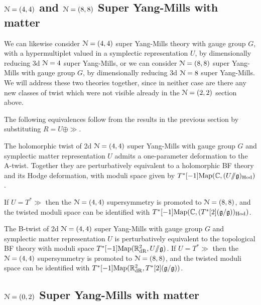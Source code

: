 \documentclass[10pt, oneside]{article}
\newcommand{\ham}{/\!\!/}
\begin{document}
\subsection{\texorpdfstring{$\mathcal N=(4,4)$}{N=(4,4)} and \texorpdfstring{$\mathcal N=(8,8)$}{N=(8,8)} Super Yang-Mills with matter} \label{sec:2d(4,4)}
We can likewise consider $\mathcal{N}=(4,4)$ super Yang-Mills theory with gauge group $G$, with a hypermultiplet valued in a symplectic representation $U$, by dimensionally reducing 3d $\mathcal{N}=4$ super Yang-Mills, or we can consider $\mathcal{N}=(8,8)$ super Yang-Mills with gauge group $G$, by dimensionally reducing 3d $\mathcal{N}=8$ super Yang-Mills.  We will address these two theories together, since in neither case are there any new classes of twist which were not visible already in the $\mathcal{N}=(2,2)$ section above.  

The following equivalences follow from the results in the previous section by substituting $R = U \oplus \gg$.

\begin{theorem}
The holomorphic twist of 2d $\mathcal{N}=(4,4)$ super Yang-Mills with gauge group $G$ and symplectic matter representation $U$ admits a one-parameter deformation to the A-twist.  Together they are perturbatively equivalent to a holomorphic BF theory and its Hodge deformation, with moduli space given by $T^*[-1]\mr{Map}(\CC, (U \ham \gg)_{\mr{Hod}})$.

If $U = T^*\gg$ then the $\mathcal{N}=(4,4)$ supersymmetry is promoted to $\mathcal{N}=(8,8)$, and the twisted moduli space can be identified with  $T^*[-1]\mathrm{Map}(\mathbb C, (T^*[2](\mathfrak{g} / \mathfrak{g}))_{\mathrm{Hod}})$.
\end{theorem}

\begin{theorem}
The B-twist of 2d $\mathcal{N}=(4,4)$ super Yang-Mills with gauge group $G$ and symplectic matter representation $U$ is perturbatively equivalent to the topological BF theory with moduli space $T^*[-1]\mr{Map}(\RR^2_{\mr{dR}}, U \ham \gg)$.  If $U = T^*\gg$ then the $\mathcal{N}=(4,4)$ supersymmetry is promoted to $\mathcal{N}=(8,8)$, and the twisted moduli space can be identified with $T^*[-1]\mathrm{Map}(\mathbb R^2_{\mathrm{dR}}, T^*[2](\mathfrak{g}/\mathfrak{g}))$.
\end{theorem}

\subsection{\texorpdfstring{$\mathcal N=(0,2)$}{N=(0,2)} Super Yang-Mills with matter} \label{sec:2d(0,2)}
\end{document}
